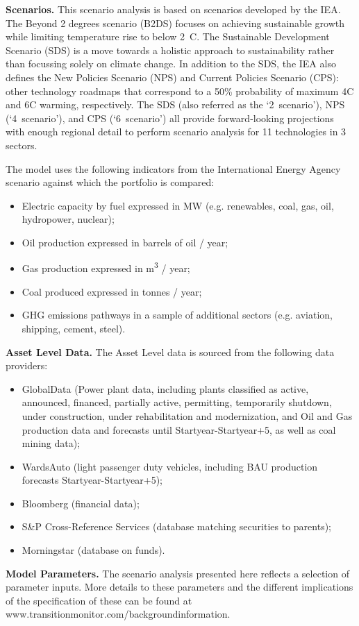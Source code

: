 \documentclass[10pt,table,a4]{article}\usepackage[]{graphicx}\usepackage[]{color}
\begin{document}
\begin{multicols}{2}
		\textbf{Scenarios.} This scenario analysis is based on scenarios developed by the IEA. The Beyond 2 degrees scenario (B2DS) focuses on achieving sustainable growth while limiting temperature rise to below 2\degree\ C. The Sustainable Development Scenario (SDS) is a move towards a holistic approach to sustainability rather than focussing solely on climate change. In addition to the SDS, the IEA also defines the New Policies Scenario (NPS) and Current Policies Scenario (CPS): other technology roadmaps that correspond to a 50\% probability of maximum 4\degree C and 6\degree C warming, respectively. The SDS (also referred as the `2\degree\ scenario'), NPS (`4\degree\ scenario'), and CPS (`6\degree\ scenario') all provide forward-looking projections with enough regional detail to perform scenario analysis for 11 technologies in 3 sectors.
		
		The model uses the following indicators from the International Energy Agency scenario against which the portfolio is compared:
		\begin{itemize}
			\item{Electric capacity by fuel expressed in MW (e.g. renewables, coal, gas, oil, hydropower, nuclear);}
			\item{Oil production expressed in barrels of oil / year;}
			\item{Gas production expressed in m\textsuperscript{3} / year;}
			\item{Coal produced expressed in tonnes / year;}
			\item{GHG emissions pathways in a sample of additional sectors (e.g. aviation, shipping, cement, steel).}
		\end{itemize}
		
		 
		\textbf{Asset Level Data.} The Asset Level data is sourced from the following data providers: 
		\begin{itemize}
			\item{GlobalData (Power plant data, including plants classified as active, announced, financed, partially active, permitting, temporarily shutdown, under construction, under rehabilitation and modernization, and Oil and Gas production data and forecasts until Startyear-Startyear+5, as well as coal mining data); }
			\item{WardsAuto (light passenger duty vehicles, including BAU production forecasts Startyear-Startyear+5); }
			\item{Bloomberg (financial data);}
			\item{S\&P Cross-Reference Services (database matching securities to parents);}
			\item{Morningstar (database on funds). }
			
		\end{itemize}
		
		\textbf{Model Parameters.} The scenario analysis presented here reflects a selection of parameter inputs. More details to these parameters and the different implications of the specification of these can be found at www.transitionmonitor.com/backgroundinformation. 
		
		
		
	\end{multicols}
	
\end{document}
